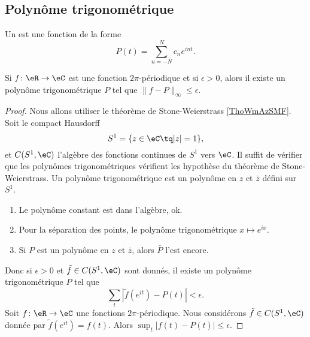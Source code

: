 \subsection{Polynôme trigonométrique}

Un  est une fonction de la forme
\begin{equation}
    P(t)=\sum_{n=-N}^Nc_n e^{int}.
\end{equation}
\begin{lemma}
    Si \( f\colon \eR\to \eC\) est une fonction \( 2\pi\)-périodique et si \( \epsilon>0\), alors il existe un polynôme trigonométrique \( P\) tel que \( \| f-P \|_{\infty}\leq \epsilon\).
\end{lemma}

\begin{proof}
    Nous allons utiliser le théorème de Stone-Weierstrass \ref{ThoWmAzSMF}. Soit le compact Hausdorff
    \begin{equation}
        S^1=\{ z\in \eC\tq | z |=1 \},
    \end{equation}
    et \( C(S^1,\eC)\) l'algèbre des fonctions continues de \( S^1\) vers \( \eC\). Il suffit de vérifier que les polynômes trigonométriques vérifient les hypothèse du théorème de Stone-Weierstrass. Un polynôme trigonométrique est un polynôme en \( z\) et \( \bar z\) défini sur \( S^1\).
    \begin{enumerate}
        \item
            Le polynôme constant est dans l'algèbre, ok.
        \item
            Pour la séparation des points, le polynôme trigonométrique \( x\mapsto  e^{ix}\).
        \item
            Si \( P\) est un polynôme en \( z\) et \( \bar z\), alors \( \bar P\) l'est encore.
    \end{enumerate}
    Donc si \( \epsilon>0\) et \( \tilde f\in C(S^1,\eC)\) sont donnés, il existe un polynôme trigonométrique \( P\) tel que
    \begin{equation}
        \sum_t| \tilde f( e^{it})-P(t) |<\epsilon.
    \end{equation}
    Soit \( f\colon \eR\to \eC\) une fonctions \( 2\pi\)-périodique. Nous considérons \( \tilde f\in C(S^1,\eC)\) donnée par \( \tilde f( e^{it})=f(t)\). Alors \( \sup_t| f(t)-P(t) |\leq \epsilon\).
\end{proof}

